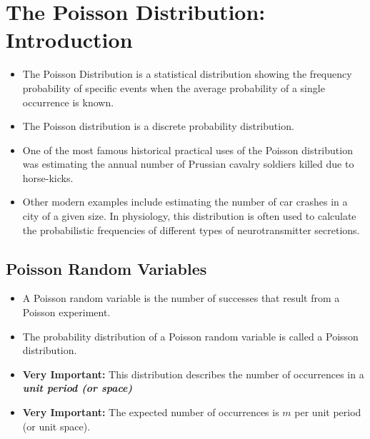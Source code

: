 \documentclass[a4paper,12pt]{article}
\begin{document}
\section*{The Poisson Distribution: Introduction}
	\begin{itemize}
		\item The Poisson Distribution is a statistical distribution showing the frequency probability of specific events when the average probability of a single occurrence is known. 
		
		\item The Poisson distribution is a discrete probability distribution.
		
		
		
		
		
		\item One of the most famous historical practical uses of the Poisson distribution was estimating the annual number of Prussian cavalry soldiers killed due to horse-kicks. 
		
		\item Other modern examples include estimating the number of car crashes in a city of a given size. In physiology, this distribution is often used to calculate the probabilistic frequencies of different types of neurotransmitter secretions. 
	\end{itemize}

\subsection*{Poisson Random Variables}

\begin{itemize}
	\item A Poisson random variable is the number of successes that result from a Poisson experiment.
	\item The probability distribution of a Poisson random variable is called a Poisson distribution.
	\item \textbf{Very Important:} This distribution describes the number of occurrences in a \textbf{\emph{unit period (or space)}}
	\item \textbf{Very Important:} The expected number of occurrences is $m$ per unit period (or unit space).
	
	

\end{itemize}
\end{document}
